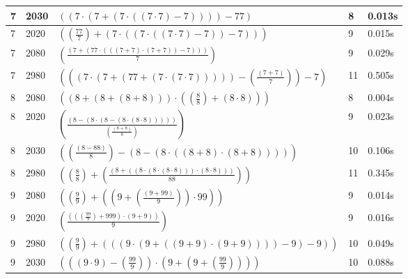 \documentclass{article}
\theoremstyle{nonumberplain}
\begin{document}
\begin{center}
\begin{longtable}{ | l | l | p{9.5cm} | l | l | }
        7 & 2030 & \( \left(\left(7 \cdot \left(7 + \left(7 \cdot \left(\left(7 \cdot 7\right) - 7\right)\right)\right)\right) - 77\right) \) & 8 & 0.013s \\\hline
        7 & 2020 & \( \left(\left(\frac{77}{7}\right) + \left(7 \cdot \left(\left(7 \cdot \left(\left(7 \cdot 7\right) - 7\right)\right) - 7\right)\right)\right) \) & 9 & 0.015s \\\hline
        7 & 2080 & \( \left(\frac{\left(7 + \left(77 \cdot \left(\left(\left(7 + 7\right) \cdot \left(7 + 7\right)\right) - 7\right)\right)\right)}{7}\right) \) & 9 & 0.029s \\\hline
        7 & 2980 & \( \left(\left(\left(7 \cdot \left(7 + \left(77 + \left(7 \cdot \left(7 \cdot 7\right)\right)\right)\right)\right) - \left(\frac{\left(7 + 7\right)}{7}\right)\right) - 7\right) \) & 11 & 0.505s \\\hline
        8 & 2080 & \( \left(\left(8 + \left(8 + \left(8 + 8\right)\right)\right) \cdot \left(\left(\frac{8}{8}\right) + \left(8 \cdot 8\right)\right)\right) \) & 8 & 0.004s \\\hline
        8 & 2020 & \( \left(\frac{\left(8 - \left(8 \cdot \left(8 - \left(8 \cdot \left(8 \cdot 8\right)\right)\right)\right)\right)}{\left(\frac{\left(8 + 8\right)}{8}\right)}\right) \) & 9 & 0.023s \\\hline
        8 & 2030 & \( \left(\left(\frac{\left(8 - 88\right)}{8}\right) - \left(8 - \left(8 \cdot \left(\left(8 + 8\right) \cdot \left(8 + 8\right)\right)\right)\right)\right) \) & 10 & 0.106s \\\hline
        8 & 2980 & \( \left(\left(\frac{8}{8}\right) + \left(\frac{\left(8 + \left(\left(8 \cdot \left(8 \cdot \left(8 \cdot 8\right)\right)\right) \cdot \left(8 \cdot 8\right)\right)\right)}{88}\right)\right) \) & 11 & 0.345s \\\hline
        9 & 2080 & \( \left(\left(\frac{9}{9}\right) + \left(\left(9 + \left(\frac{\left(9 + 99\right)}{9}\right)\right) \cdot 99\right)\right) \) & 9 & 0.014s \\\hline
        9 & 2020 & \( \left(\frac{\left(\left(\left(\frac{99}{9}\right) + 999\right) \cdot \left(9 + 9\right)\right)}{9}\right) \) & 9 & 0.016s \\\hline
        9 & 2980 & \( \left(\left(\frac{9}{9}\right) + \left(\left(\left(9 \cdot \left(9 + \left(\left(9 + 9\right) \cdot \left(9 + 9\right)\right)\right)\right) - 9\right) - 9\right)\right) \) & 10 & 0.049s \\\hline
        9 & 2030 & \( \left(\left(\left(9 \cdot 9\right) - \left(\frac{99}{9}\right)\right) \cdot \left(9 + \left(9 + \left(\frac{99}{9}\right)\right)\right)\right) \) & 10 & 0.088s \\\hline
\end{longtable}
\end{center}
\end{document}
